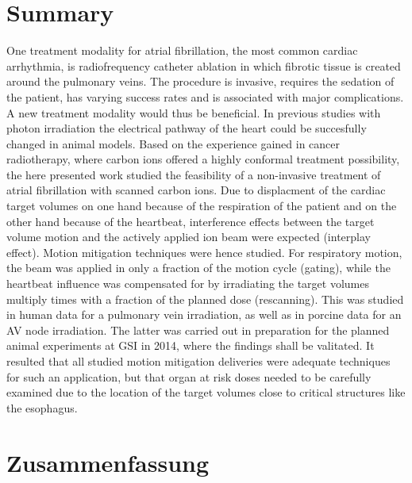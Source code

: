 \documentclass[type=dr, dr=rernat, accentcolor=tud7b,colorbacktitle, bigchapter, openright, twoside, 12pt ]{tudthesis}
\begin{document}
\section*{Summary}

One treatment modality for atrial fibrillation, the most common cardiac arrhythmia, is radiofrequency catheter ablation in which 
fibrotic tissue is created around the pulmonary veins. The procedure is invasive, requires the sedation of the patient, has varying success 
rates and is associated with major complications. A new treatment modality would thus be beneficial. In previous studies with photon irradiation  
the electrical pathway of the heart could be succesfully changed in animal models. Based on the experience gained in cancer radiotherapy, 
where carbon ions offered a highly conformal treatment possibility, the here presented work studied the feasibility of a non-invasive 
treatment of atrial fibrillation with scanned carbon ions. Due to displacment of the cardiac target volumes on one hand because of the respiration 
of the patient and on the other hand because of the heartbeat, interference effects between the target volume motion and the actively applied 
ion beam were expected (interplay effect). Motion mitigation techniques were hence studied. For respiratory motion, the beam was applied in only a fraction of the 
motion cycle (gating), while the heartbeat influence was compensated for by irradiating the target volumes multiply times with a fraction of 
the planned dose (rescanning). This was studied in human data for a pulmonary vein irradiation, as well as in porcine data for an AV node irradiation. 
The latter was carried out in preparation for the planned animal experiments at GSI in 2014, where the findings shall be valitated. 
It resulted that all studied motion mitigation deliveries 
were adequate techniques for such an application, but that organ at risk doses needed to be carefully examined due to the location of the 
target volumes close to critical structures like the esophagus. 

\newpage

\section*{Zusammenfassung}
\end{document}
